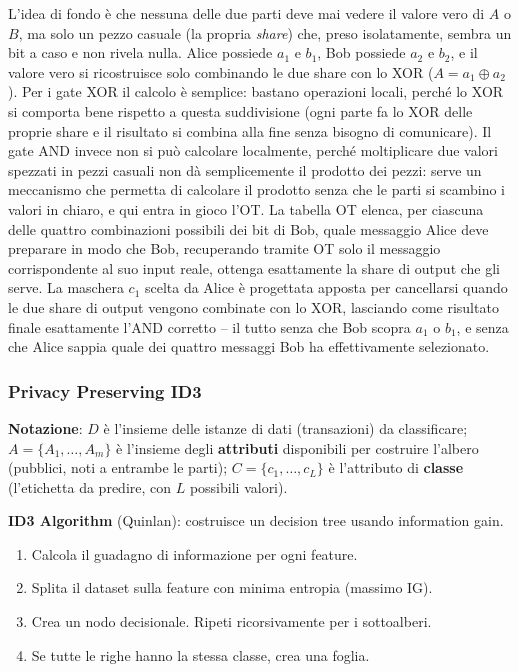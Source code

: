 \documentclass[a4paper,11pt]{article}
\begin{document}
\begin{nota}
L'idea di fondo è che nessuna delle due parti deve mai vedere il valore vero di $A$ o $B$, ma solo un pezzo casuale (la propria \emph{share}) che, preso isolatamente, sembra un bit a caso e non rivela nulla. Alice possiede $a_1$ e $b_1$, Bob possiede $a_2$ e $b_2$, e il valore vero si ricostruisce solo combinando le due share con lo XOR ($A = a_1 \oplus a_2$). Per i gate XOR il calcolo è semplice: bastano operazioni locali, perché lo XOR si comporta bene rispetto a questa suddivisione (ogni parte fa lo XOR delle proprie share e il risultato si combina alla fine senza bisogno di comunicare). Il gate AND invece non si può calcolare localmente, perché moltiplicare due valori spezzati in pezzi casuali non dà semplicemente il prodotto dei pezzi: serve un meccanismo che permetta di calcolare il prodotto senza che le parti si scambino i valori in chiaro, e qui entra in gioco l'OT. La tabella OT elenca, per ciascuna delle quattro combinazioni possibili dei bit di Bob, quale messaggio Alice deve preparare in modo che Bob, recuperando tramite OT solo il messaggio corrispondente al suo input reale, ottenga esattamente la share di output che gli serve. La maschera $c_1$ scelta da Alice è progettata apposta per cancellarsi quando le due share di output vengono combinate con lo XOR, lasciando come risultato finale esattamente l'AND corretto -- il tutto senza che Bob scopra $a_1$ o $b_1$, e senza che Alice sappia quale dei quattro messaggi Bob ha effettivamente selezionato.
\end{nota}

\subsubsection{Privacy Preserving ID3}

\textbf{Notazione}: $D$ \`{e} l'insieme delle istanze di dati (transazioni) da classificare; $A = \{A_1, \ldots, A_m\}$ \`{e} l'insieme degli \textbf{attributi} disponibili per costruire l'albero (pubblici, noti a entrambe le parti); $C = \{c_1, \ldots, c_L\}$ \`{e} l'attributo di \textbf{classe} (l'etichetta da predire, con $L$ possibili valori).

\textbf{ID3 Algorithm} (Quinlan): costruisce un decision tree usando information gain.
\begin{enumerate}
  \item Calcola il guadagno di informazione per ogni feature.
  \item Splita il dataset sulla feature con minima entropia (massimo IG).
  \item Crea un nodo decisionale. Ripeti ricorsivamente per i sottoalberi.
  \item Se tutte le righe hanno la stessa classe, crea una foglia.
\end{enumerate}
\end{document}
